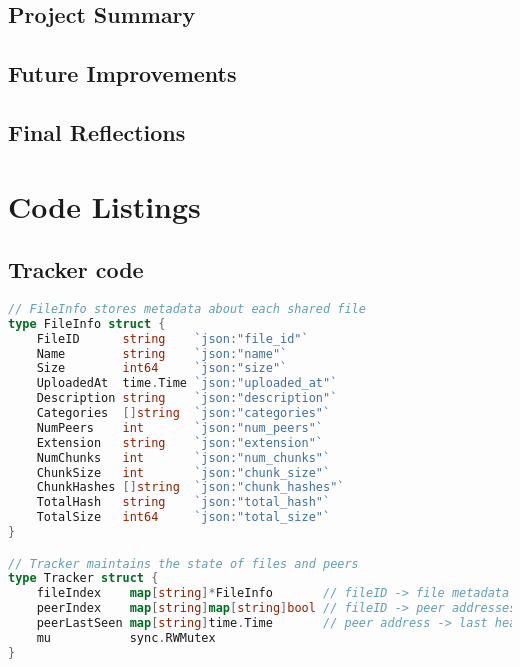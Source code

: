 \documentclass[12pt,a4paper]{report}
\begin{document}
\section{Project Summary}

\section{Future Improvements}

\section{Final Reflections}

\appendix
\chapter{Code Listings}

\section{Tracker code}
\begin{lstlisting}[language=Go, caption={TCP transport implementation}, label={lst:tracker-code}]
// FileInfo stores metadata about each shared file
type FileInfo struct {
    FileID      string    `json:"file_id"`
    Name        string    `json:"name"`
    Size        int64     `json:"size"`
    UploadedAt  time.Time `json:"uploaded_at"`
    Description string    `json:"description"`
    Categories  []string  `json:"categories"`
    NumPeers    int       `json:"num_peers"`
    Extension   string    `json:"extension"`
    NumChunks   int       `json:"num_chunks"`
    ChunkSize   int       `json:"chunk_size"`
    ChunkHashes []string  `json:"chunk_hashes"`
    TotalHash   string    `json:"total_hash"`
    TotalSize   int64     `json:"total_size"`
}

// Tracker maintains the state of files and peers
type Tracker struct {
    fileIndex    map[string]*FileInfo       // fileID -> file metadata
    peerIndex    map[string]map[string]bool // fileID -> peer addresses
    peerLastSeen map[string]time.Time       // peer address -> last heartbeat
    mu           sync.RWMutex
}
\end{lstlisting}
\end{document}
